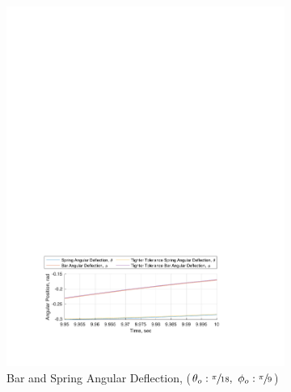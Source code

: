\documentclass[12pt]{report}
\begin{document}
\begin{flushleft}
\begin{figure}[!htp]
\begin{subfigure}{\textwidth}
    \includegraphics[center]{3}
    \caption*{Bar and Spring Angular Deflection, ($\theta_o:\sfrac{\pi}{18},~\phi_o:\sfrac{\pi}{9}$)}
  \end{subfigure}
  \begin{subfigure}{\textwidth}

\end{subfigure}
\end{figure}
\end{flushleft}
\end{document}
